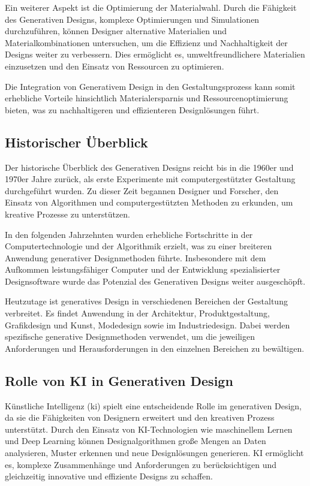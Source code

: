 Ein weiterer Aspekt ist die Optimierung der Materialwahl. Durch die Fähigkeit des Generativen Designs, komplexe Optimierungen und Simulationen durchzuführen, können Designer alternative Materialien und Materialkombinationen untersuchen, um die Effizienz und Nachhaltigkeit der Designs weiter zu verbessern. Dies ermöglicht es, umweltfreundlichere Materialien einzusetzen und den Einsatz von Ressourcen zu optimieren.

Die Integration von Generativem Design in den Gestaltungsprozess kann somit erhebliche Vorteile hinsichtlich Materialersparnis und Ressourcenoptimierung bieten, was zu nachhaltigeren und effizienteren Designlösungen führt. \autocite*{20}

\subsection*{Historischer Überblick}
Der historische Überblick des Generativen Designs reicht bis in die 1960er und 1970er Jahre zurück, als erste Experimente mit computergestützter Gestaltung durchgeführt wurden. Zu dieser Zeit begannen Designer und Forscher, den Einsatz von Algorithmen und computergestützten Methoden zu erkunden, um kreative Prozesse zu unterstützen.

In den folgenden Jahrzehnten wurden erhebliche Fortschritte in der Computertechnologie und der Algorithmik erzielt, was zu einer breiteren Anwendung generativer Designmethoden führte. Insbesondere mit dem Aufkommen leistungsfähiger Computer und der Entwicklung spezialisierter Designsoftware wurde das Potenzial des Generativen Designs weiter ausgeschöpft.

Heutzutage ist generatives Design in verschiedenen Bereichen der Gestaltung verbreitet. Es findet Anwendung in der Architektur, Produktgestaltung, Grafikdesign und Kunst, Modedesign sowie im Industriedesign. Dabei werden spezifische generative Designmethoden verwendet, um die jeweiligen Anforderungen und Herausforderungen in den einzelnen Bereichen zu bewältigen. \autocite*{18}

\subsection*{Rolle von KI in Generativen Design}
Künstliche Intelligenz (\ac{ki}) spielt eine entscheidende Rolle im generativen Design, da sie die Fähigkeiten von Designern erweitert und den kreativen Prozess unterstützt. Durch den Einsatz von KI-Technologien wie maschinellem Lernen und Deep Learning können Designalgorithmen große Mengen an Daten analysieren, Muster erkennen und neue Designlösungen generieren. KI ermöglicht es, komplexe Zusammenhänge und Anforderungen zu berücksichtigen und gleichzeitig innovative und effiziente Designs zu schaffen.

